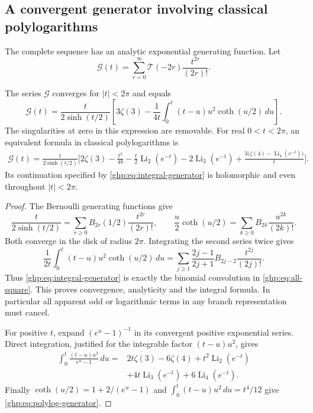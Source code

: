 \subsection{A convergent generator involving classical polylogarithms}

The complete sequence has an analytic exponential generating function.
Let
\[
 \mathcal G(t)=\sum_{r=0}^{\infty}
               \mathcal T(-2r)\frac{t^{2r}}{(2r)!}.
\]

\begin{theorem}\label{ghp:thm:generator}
The series $\mathcal G$ converges for $|t|<2\pi$ and equals
\begin{equation}\label{ghp:eq:integral-generator}
 \mathcal G(t)=\frac{t}{2\sinh(t/2)}
   \left[3\zeta(3)-\frac1{4t}
       \int_0^t(t-u)u^2\coth(u/2)\,du\right].
\end{equation}
The singularities at zero in this expression are removable. For
real $0<t<2\pi$, an equivalent formula in classical polylogarithms is
\begin{align}\label{ghp:eq:polylog-generator}
 \mathcal G(t)=\frac{t}{2\sinh(t/2)}\bigg[
 2\zeta(3)-\frac{t^3}{48}
 -\frac t2\operatorname{Li}_2(e^{-t})
 -2\operatorname{Li}_3(e^{-t})
 +\frac{3\bigl(\zeta(4)-\operatorname{Li}_4(e^{-t})\bigr)}t
 \bigg].
\end{align}
Its continuation specified by \eqref{ghp:eq:integral-generator} is
holomorphic and even throughout $|t|<2\pi$.
\end{theorem}

\begin{proof}
The Bernoulli generating functions give
\[
 \frac{t}{2\sinh(t/2)}
     =\sum_{r\geq0}B_{2r}(1/2)\frac{t^{2r}}{(2r)!},
 \qquad
 \frac u2\coth(u/2)
     =\sum_{k\geq0}B_{2k}\frac{u^{2k}}{(2k)!}.
\]
Both converge in the disk of radius $2\pi$. Integrating the second
series twice gives
\[
 \frac1{2t}\int_0^t(t-u)u^2\coth(u/2)\,du
  =\sum_{j\geq1}\frac{2j-1}{2j+1}B_{2j-2}
                  \frac{t^{2j}}{(2j)!}.
\]
Thus \eqref{ghp:eq:integral-generator} is exactly the binomial
convolution in \eqref{ghp:eq:all-square}. This proves convergence,
analyticity and the integral formula. In particular all apparent odd
or logarithmic terms in any branch representation must cancel.

For positive $t$, expand $(e^u-1)^{-1}$ in its convergent positive
exponential series. Direct integration, justified for the integrable
factor $(t-u)u^2$, gives
\begin{align*}
 \int_0^t\frac{(t-u)u^2}{e^u-1}\,du
  ={}&2t\zeta(3)-6\zeta(4)
      +t^2\operatorname{Li}_2(e^{-t})\\
     &+4t\operatorname{Li}_3(e^{-t})
      +6\operatorname{Li}_4(e^{-t}).
\end{align*}
Finally $\coth(u/2)=1+2/(e^u-1)$ and
$\int_0^t(t-u)u^2\,du=t^4/12$ give
\eqref{ghp:eq:polylog-generator}.
\end{proof}

